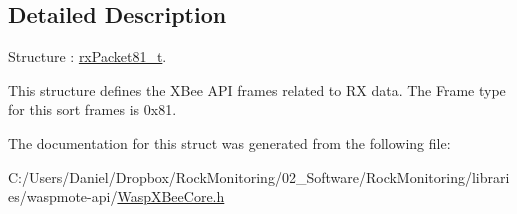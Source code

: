 \subsection{Detailed Description}
Structure \+: \hyperlink{structrx_packet81__t}{rx\+Packet81\+\_\+t}. 

This structure defines the X\+Bee A\+PI frames related to RX data. The Frame type for this sort frames is 0x81. 

The documentation for this struct was generated from the following file\+:\begin{DoxyCompactItemize}
\item 
C\+:/\+Users/\+Daniel/\+Dropbox/\+Rock\+Monitoring/02\+\_\+\+Software/\+Rock\+Monitoring/libraries/waspmote-\/api/\hyperlink{_wasp_x_bee_core_8h}{Wasp\+X\+Bee\+Core.\+h}\end{DoxyCompactItemize}
